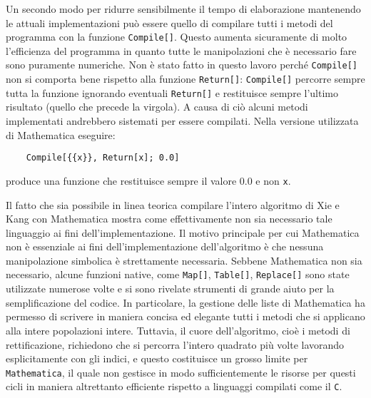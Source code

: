 \documentclass[italian,twoside,twocolumn]{article}
\begin{document}

Un secondo modo per ridurre sensibilmente il tempo di elaborazione mantenendo le attuali implementazioni può essere quello di compilare tutti i metodi del programma con la funzione \texttt{Compile[]}. Questo aumenta sicuramente di molto l'efficienza del programma in quanto tutte le manipolazioni che è necessario fare sono puramente numeriche. Non è stato fatto in questo lavoro perché \texttt{Compile[]} non si comporta bene rispetto alla funzione \texttt{Return[]}: \texttt{Compile[]} percorre sempre tutta la funzione ignorando eventuali \texttt{Return[]} e restituisce sempre l'ultimo risultato (quello che precede la virgola). A causa di ciò alcuni metodi implementati andrebbero sistemati per essere compilati. Nella versione utilizzata di Mathematica eseguire:
\begin{verbatim}
	Compile[{{x}}, Return[x]; 0.0]
\end{verbatim}
produce una funzione che restituisce sempre il valore 0.0 e non \texttt{x}.

Il fatto che sia possibile in linea teorica compilare l'intero algoritmo di Xie e Kang con Mathematica mostra come effettivamente non sia necessario tale linguaggio ai fini dell'implementazione. Il motivo principale per cui Mathematica non è essenziale ai fini dell'implementazione dell'algoritmo è che nessuna manipolazione simbolica è strettamente necessaria. Sebbene Mathematica non sia necessario, alcune funzioni native, come \texttt{Map[]}, \texttt{Table[]}, \texttt{Replace[]} sono state utilizzate numerose volte e si sono rivelate strumenti di grande aiuto per la semplificazione del codice. In particolare, la gestione delle liste di Mathematica ha permesso di scrivere in maniera concisa ed elegante tutti i metodi che si applicano alla intere popolazioni intere. Tuttavia, il cuore dell'algoritmo, cioè i metodi di rettificazione, richiedono che si percorra l'intero quadrato più volte lavorando esplicitamente con gli indici, e questo costituisce un grosso limite per \texttt{Mathematica}, il quale non gestisce in modo sufficientemente le risorse per questi cicli in maniera altrettanto efficiente rispetto a linguaggi compilati come il \texttt{C}.
\end{document}
